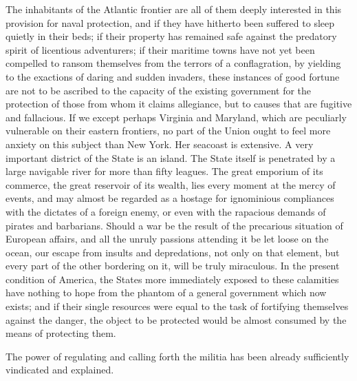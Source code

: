 The inhabitants of the Atlantic frontier are all of them deeply interested in this provision for naval protection, and if they have hitherto been suffered to sleep quietly in their beds; if their property has remained safe against the predatory spirit of licentious adventurers; if their maritime towns have not yet been compelled to ransom themselves from the terrors of a conflagration, by yielding to the exactions of daring and sudden invaders, these instances of good fortune are not to be ascribed to the capacity of the existing government for the protection of those from whom it claims allegiance, but to causes that are fugitive and fallacious. If we except perhaps Virginia and Maryland, which are peculiarly vulnerable on their eastern frontiers, no part of the Union ought to feel more anxiety on this subject than New York. Her seacoast is extensive. A very important district of the State is an island. The State itself is penetrated by a large navigable river for more than fifty leagues. The great emporium of its commerce, the great reservoir of its wealth, lies every moment at the mercy of events, and may almost be regarded as a hostage for ignominious compliances with the dictates of a foreign enemy, or even with the rapacious demands of pirates and barbarians. Should a war be the result of the precarious situation of European affairs, and all the unruly passions attending it be let loose on the ocean, our escape from insults and depredations, not only on that element, but every part of the other bordering on it, will be truly miraculous. In the present condition of America, the States more immediately exposed to these calamities have nothing to hope from the phantom of a general government which now exists; and if their single resources were equal to the task of fortifying themselves against the danger, the object to be protected would be almost consumed by the means of protecting them.

The power of regulating and calling forth the militia has been already sufficiently vindicated and explained.

